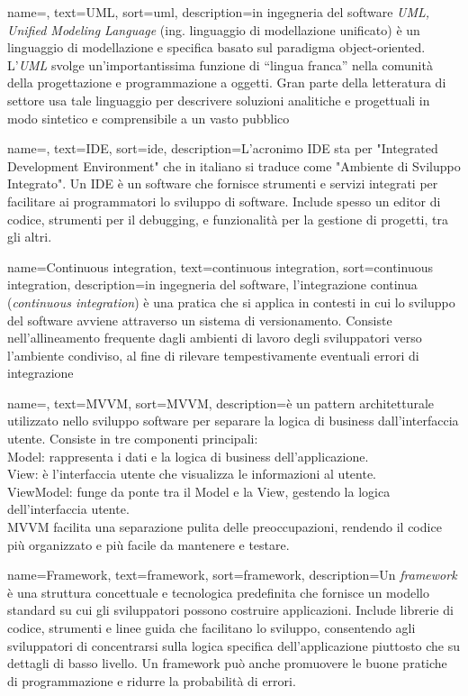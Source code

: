  {
    name=,
    text=UML,
    sort=uml,
    description={in ingegneria del software \emph{UML, Unified Modeling Language} (ing. linguaggio di modellazione unificato) è un linguaggio di modellazione e specifica basato sul paradigma object-oriented. L'\emph{UML} svolge un'importantissima funzione di ``lingua franca'' nella comunità della progettazione e programmazione a oggetti. Gran parte della letteratura di settore usa tale linguaggio per descrivere soluzioni analitiche e progettuali in modo sintetico e comprensibile a un vasto pubblico}
}

 {
    name=,
    text=IDE,
    sort=ide,
    description={L'acronimo IDE sta per "Integrated Development Environment" che in italiano si traduce come "Ambiente di Sviluppo Integrato". Un IDE è un software che fornisce strumenti e servizi integrati per facilitare ai programmatori lo sviluppo di software. Include spesso un editor di codice, strumenti per il debugging, e funzionalità per la gestione di progetti, tra gli altri.}
}

 {
    name=Continuous integration,
    text=continuous integration,
    sort=continuous integration,
    description={in ingegneria del software, l'integrazione continua (\textit{continuous integration}) è una pratica che si applica in contesti in cui lo sviluppo del software avviene attraverso un sistema di versionamento. Consiste nell'allineamento frequente dagli ambienti di lavoro degli sviluppatori verso l'ambiente condiviso, al fine di rilevare tempestivamente eventuali errori di integrazione}
}

 {
    name=,
    text=MVVM,
    sort=MVVM,
    description={è un pattern architetturale utilizzato nello sviluppo software per separare la logica di business dall'interfaccia utente. Consiste in tre componenti principali:\\
    Model: rappresenta i dati e la logica di business dell'applicazione.\\
    View: è l'interfaccia utente che visualizza le informazioni al utente.\\
    ViewModel: funge da ponte tra il Model e la View, gestendo la logica dell'interfaccia utente.\\
    MVVM facilita una separazione pulita delle preoccupazioni, rendendo il codice più organizzato e più facile da mantenere e testare.}
}


 {
    name=Framework,
    text=framework,
    sort=framework,
    description={Un \textit{framework} è una struttura concettuale e tecnologica predefinita che fornisce un modello standard su cui gli sviluppatori possono costruire applicazioni. Include librerie di codice, strumenti e linee guida che facilitano lo sviluppo, consentendo agli sviluppatori di concentrarsi sulla logica specifica dell'applicazione piuttosto che su dettagli di basso livello. Un framework può anche promuovere le buone pratiche di programmazione e ridurre la probabilità di errori.}
}

